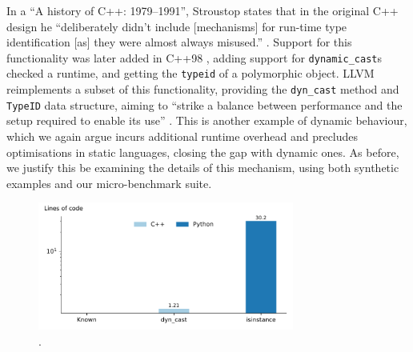 In a ``A history of C++: 1979--1991'', Stroustop states that in the original C++ design he ``deliberately didn't include [mechanisms] for run-time type identification [as] they were almost always misused.'' \cite{stroustrupHistory197919911996}.
Support for this functionality was later added in C++98 \cite{internationalorganizationforstandardizationISOIEC148821998}, adding support for \texttt{dynamic\_cast}s checked a runtime, and getting the \texttt{typeid} of a polymorphic object. LLVM reimplements a subset of this functionality, providing the \texttt{dyn\_cast} method and \texttt{TypeID} data structure, aiming to ``strike a balance between performance and the setup required to enable its use'' \cite{mlirteamMLIRCodeDocumentation}.
This is another example of dynamic behaviour, which we again argue incurs additional runtime overhead and precludes optimisations in static languages, closing the gap with dynamic ones.
As before, we justify this be examining the details of this mechanism, using both synthetic examples and our micro-benchmark suite.


\begin{figure}[H]
    \centering
    \includegraphics[width=0.75\textwidth]{images/impact_dynamism/dynamic_cast.pdf}
    \caption{.}
    \label{figure:impact-rtti}
\end{figure}










